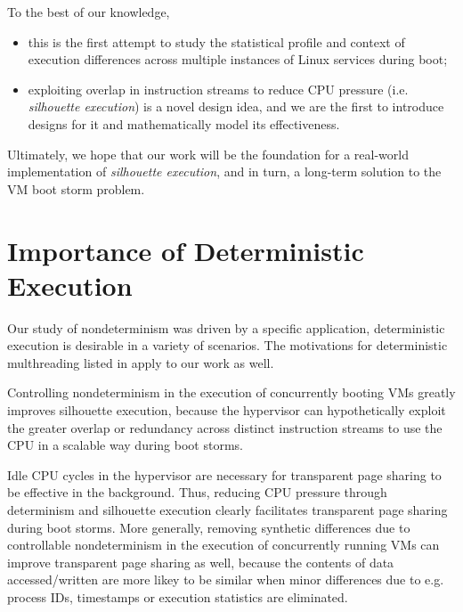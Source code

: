 \noindent To the best of our knowledge,
\begin {itemize}
\item this is the first attempt to study the statistical profile and context of execution differences
  across multiple instances of Linux services during boot;
\item exploiting overlap in instruction streams to reduce CPU pressure (i.e. {\em silhouette execution}) is a novel 
  design idea, and we are the first to introduce designs for it and mathematically model its effectiveness.
\end {itemize}

\noindent Ultimately, we hope that our work will be the foundation for a real-world implementation of {\em silhouette execution},
and in turn, a long-term solution to the VM boot storm problem. 

\section{Importance of Deterministic Execution}
Our study of nondeterminism was driven by a specific application,
deterministic execution is desirable in a variety of scenarios.
The motivations for deterministic multhreading listed in
\cite{marek2011scaling, patil2010pinplay} apply to our work as well. \newline

 \newline 
Controlling nondeterminism in the execution of concurrently
booting VMs greatly improves silhouette execution, because the hypervisor
can hypothetically exploit the greater overlap or redundancy
across distinct instruction streams to use the CPU
in a scalable way during boot storms. \newline

 \newline
Idle CPU cycles in the hypervisor are necessary for transparent page sharing
to be effective in the background. Thus, reducing CPU 
pressure through determinism and silhouette execution clearly facilitates
transparent page sharing during boot storms.
More generally, removing synthetic differences due to controllable nondeterminism in the execution
of concurrently running VMs can improve transparent page sharing
as well, because the contents of data accessed/written are more likey
to be similar when minor differences due to e.g. process IDs,
timestamps or execution statistics are eliminated. \newline

